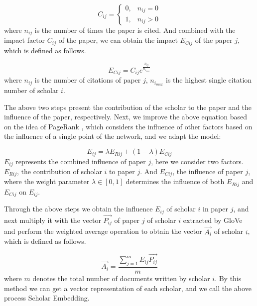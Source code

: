 \documentclass[a4paper]{jpconf}
\begin{document}
\begin{equation}\label{eq:C}
    C_{ij} = \begin{cases} 0,& {{n_{ij}} = 0} \\ 1, & {{n_{ij}} > 0} \end{cases}
\end{equation}
where \(n_{ij}\) is the number of times the paper is cited. And
combined with the impact factor \(C_{ij}\) of the paper, we can
obtain the impact \(E_{Cij}\) of the paper \(j\), which is defined
as follows.

\begin{equation}\label{eq:Ec}
    E_{Cij} = C_{ij} e^{\frac{n_{ij}}{n_{i_{max}}}}
\end{equation}
where \(n_{ij}\) is the number of citations of paper
\(j\), \(n_{i_{max}}\) is the highest single citation number of scholar \(i\).

The above two steps present the contribution of the scholar to the paper and the influence of the paper, respectively. Next, we improve the above equation based on the idea of PageRank \cite{ilprints422}, which considers the influence of other factors based on the influence of a single point of the network, and we adapt the model:

\begin{equation}\label{eq:E}
   E_{ij} = \lambda E_{Rij} + (1-\lambda)E_{Cij}
\end{equation}
\(E_{ij}\) represents the combined influence of paper \(j\), here
we consider two factors. \(E_{Rij}\), the contribution of scholar \(i\) to paper
\(j\). And \(E_{Cij}\), the influence of paper \(j\),
where the weight parameter \(\lambda \in [0, 1]\) determines the influence of both
\(E_{Rij}\) and \(E_{Cij}\) on \(E_{ij}\).

Through the above steps we obtain the influence \(E_{ij}\) of scholar
\(i\) in paper \(j\), and next multiply it with the vector
\(\vec{P_{ij}}\) of paper \(j\) of scholar \(i\) extracted by GloVe
and perform the weighted average operation to obtain the vector
\(\vec{A_i}\) of scholar \(i\), which is defined as follows.

\begin{equation}\label{eq:A}
    \vec{A_i} = \frac{\sum_{j=1}^{m} E_{ij} \vec{P_{ij}}}{m}
\end{equation}
where \(m\) denotes the total number of documents written by scholar
\(i\). By this method we can get a vector representation of each
scholar, and we call the above process Scholar Embedding.
\end{document}
